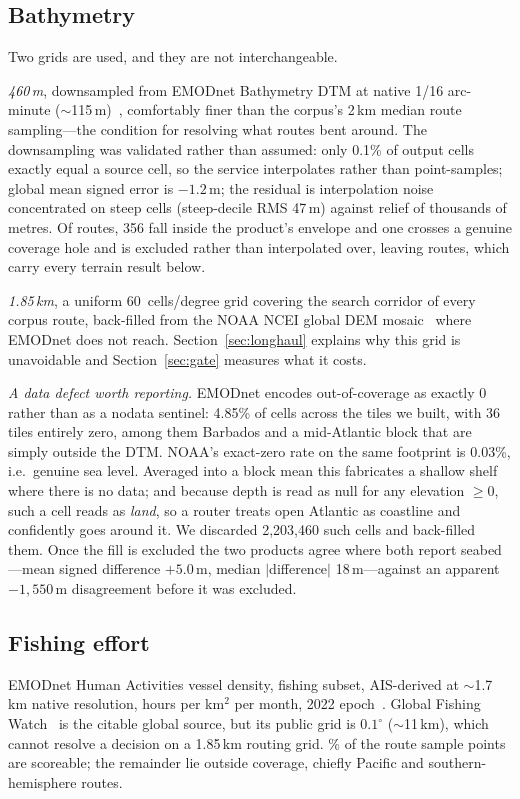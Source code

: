 \documentclass[journal]{IEEEtran}
\begin{document}
\subsection{Bathymetry}
Two grids are used, and they are not interchangeable.

\emph{460\,m}, downsampled from EMODnet Bathymetry DTM at native 1/16
arc-minute ($\sim$115\,m)~\cite{emodnet_bathymetry}, comfortably finer than the
corpus's 2\,km median route sampling---the condition for resolving what routes
bent around. The downsampling was validated rather than assumed: only 0.1\% of
output cells exactly equal a source cell, so the service interpolates rather
than point-samples; global mean signed error is $-1.2$\,m; the residual is
interpolation noise concentrated on steep cells (steep-decile RMS 47\,m)
against relief of thousands of metres. Of \nCorpusRoutes{} routes, 356 fall
inside the product's envelope and one crosses a genuine coverage hole and is
excluded rather than interpolated over, leaving \nBathyRoutes{} routes, which
carry every terrain result below.

\emph{1.85\,km}, a uniform 60~cells/degree grid covering the search corridor of
every corpus route, back-filled from the NOAA NCEI global DEM
mosaic~\cite{noaa_ncei_dem} where EMODnet does not reach.
Section~\ref{sec:longhaul} explains why this grid is unavoidable and
Section~\ref{sec:gate} measures what it costs.

\emph{A data defect worth reporting.} EMODnet encodes out-of-coverage as
exactly $0$ rather than as a nodata sentinel: 4.85\% of cells across the tiles
we built, with 36 tiles entirely zero, among them Barbados and a mid-Atlantic
block that are simply outside the DTM. NOAA's exact-zero rate on the same
footprint is 0.03\%, i.e.\ genuine sea level. Averaged into a block mean this
fabricates a shallow shelf where there is no data; and because depth is read as
null for any elevation $\geq 0$, such a cell reads as \emph{land}, so a router
treats open Atlantic as coastline and confidently goes around it. We discarded
2{,}203{,}460 such cells and back-filled them. Once the fill is excluded the two
products agree where both report seabed---mean signed difference $+5.0$\,m,
median $|$difference$|$ 18\,m---against an apparent $-1{,}550$\,m disagreement
before it was excluded.

\subsection{Fishing effort}
EMODnet Human Activities vessel density, fishing subset, AIS-derived at
$\sim$1.7\,km native resolution, hours per km$^2$ per month, 2022
epoch~\cite{emodnet_vesseldensity}. Global Fishing
Watch~\cite{kroodsma2018gfw} is the citable global source, but its public grid
is $0.1^\circ$ ($\sim$11\,km), which cannot resolve a decision on a 1.85\,km
routing grid. \nFishUsablePct\% of the \nFishSamples{} route sample points are
scoreable; the remainder lie outside coverage, chiefly Pacific and
southern-hemisphere routes.
\end{document}
